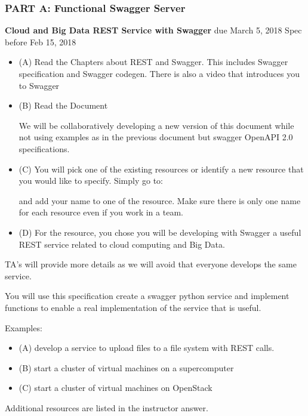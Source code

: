 \subsubsection{PART A: Functional Swagger Server}
\begin{exercise} {\bf Cloud and Big Data REST Service with Swagger}
  due March 5, 2018 Spec before Feb 15, 2018

\begin{itemize}
     
\item (A) Read the Chapters about REST and Swagger. This includes
  Swagger specification and Swagger codegen. There is also a video
  that introduces you to Swagger 
 
\item (B) Read the Document
 
  We will be collaboratively developing a new version of this document
  while not using examples as in the previous document but swagger
  OpenAPI 2.0 specifications.
 
\item (C) You will pick one of the existing resources or identify a
  new resource that you would like to specify. Simply go to:


and add your name to one of the resource. Make sure there is only one
name for each resource even if you work in a team.
 
\item (D) For the resource, you chose you will be developing with
  Swagger a useful REST service related to cloud computing and Big
  Data.

 
 \end{itemize}

 TA's will provide more details as we will avoid that everyone
 develops the same service.
 
 You will use this specification create a swagger python service and
 implement functions to enable a real implementation of the service
 that is useful.

 
Examples:

\begin{itemize}
\smallskip
\item (A) develop a service to upload files to a file system with REST calls.

\item (B) start a cluster of virtual machines on a supercomputer

\item (C) start a cluster of virtual machines on OpenStack

\end{itemize}


Additional resources are listed in the instructor answer. 
\end{exercise}

